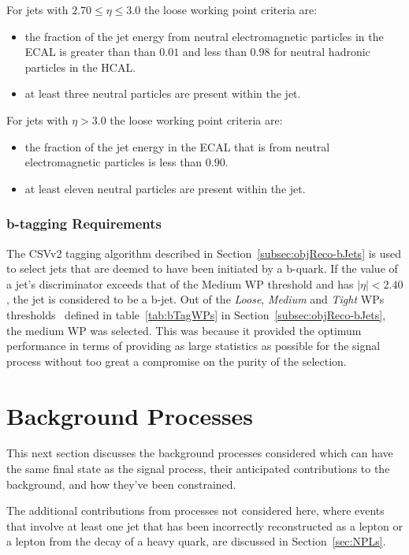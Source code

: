 For jets with $ 2.70 \leq \eta \leq 3.0$ the loose working point criteria are:
\begin{itemize}
\item the fraction of the jet energy from neutral electromagnetic particles in the ECAL is greater than than $0.01$ and less than $0.98$ for neutral hadronic particles in the HCAL.
\item at least three neutral particles are present within the jet.
\end{itemize}

For jets with $\eta > 3.0$ the loose working point criteria are:
\begin{itemize}
\item the fraction of the jet energy in the ECAL that is from neutral electromagnetic particles is less than $0.90$.
\item at least eleven neutral particles are present within the jet.
\end{itemize}

\subsubsection{b-tagging Requirements}\label{subsubsec:bTag}
The CSVv2 tagging algorithm described in Section~\ref{subsec:objReco-bJets} is used to select jets that are deemed to have been initiated by a b-quark.
If the value of a jet's discriminator exceeds that of the Medium WP threshold and has $|\eta| < 2.40$, the jet is considered to be a b-jet.
Out of the \emph{Loose}, \emph{Medium} and \emph{Tight} WPs thresholds~\cite{Sirunyan:2017ezt} defined in table~\ref{tab:bTagWPs} in Section~\ref{subsec:objReco-bJets}, the medium WP was selected.
This was because it provided the optimum performance in terms of providing as large statistics as possible for the signal process without too great a compromise on the purity of the selection.

\section{Background Processes}\label{sec:backgroundProcesses}
This next section discusses the background processes considered which can have the same final state as the signal process, their anticipated contributions to the background, and how they've been constrained.

The additional contributions from processes not considered here, where events that involve at least one jet that has been incorrectly reconstructed as a lepton or a lepton from the decay of a heavy quark, are discussed in Section~\ref{sec:NPLs}.

